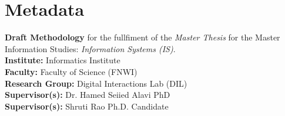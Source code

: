 \section*{Metadata}

\textbf{Draft Methodology} for the fullfiment of the \emph{Master Thesis} for the Master Information Studies: \emph{Information Systems (IS)}. \\

{\parindent0pt \textbf{Institute:} Informatics Institute} \\
\textbf{Faculty:} Faculty of Science (FNWI) \\
\textbf{Research Group:} Digital Interactions Lab (DIL) \\
\textbf{Supervisor(s):} Dr. Hamed Seiied Alavi PhD \\
\textbf{Supervisor(s):} Shruti Rao Ph.D. Candidate \\

